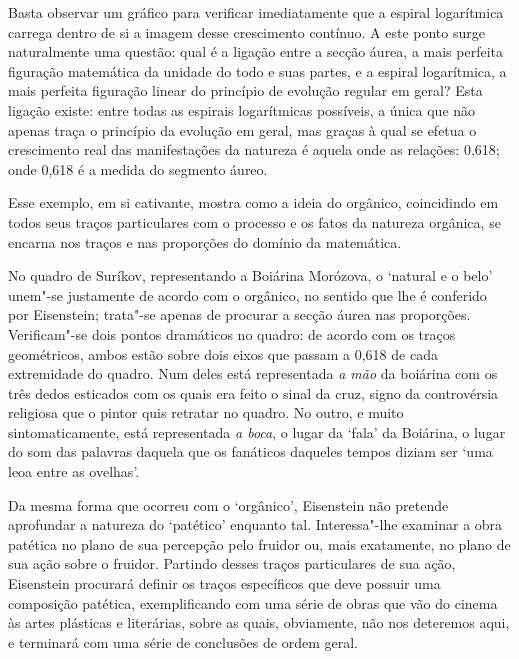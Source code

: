 Basta observar um gráfico para verificar imediatamente que a espiral
logarítmica carrega dentro de si a imagem desse crescimento contínuo. A
este ponto surge naturalmente uma questão: qual é a ligação entre a
secção áurea, a mais perfeita figuração matemática da unidade do todo e
suas partes, e a espiral logarítmica, a mais perfeita figuração linear
do princípio de evolução regular em geral? Esta ligação existe: entre
todas as espirais logarítmicas possíveis, a única que não apenas traça o
princípio da evolução em geral, mas graças à qual se efetua o
crescimento real das manifestações da natureza é aquela onde as
relações:
0,618; onde 0,618 é a medida do segmento áureo.

Esse exemplo, em si cativante, mostra como a ideia do orgânico,
coincidindo em todos seus traços particulares com o processo e os fatos
da natureza orgânica, se encarna nos traços e nas proporções do domínio
da matemática.

No quadro de Suríkov, representando a Boiárina Morózova, o `natural e o
belo' unem"-se justamente de acordo com o orgânico, no sentido que lhe é
conferido por Eisenstein; trata"-se apenas de procurar a secção áurea nas
proporções. Verificam"-se dois pontos dramáticos no quadro: de acordo com
os traços geométricos, ambos estão sobre dois eixos que passam a 0,618
de cada extremidade do quadro. Num deles está representada \emph{a
mão} da boiárina com os três dedos esticados com os quais era feito o
sinal da cruz, signo da controvérsia religiosa que o pintor quis
retratar no quadro. No outro, e muito sintomaticamente, está
representada \emph{a boca}, o lugar da `fala' da Boiárina, o lugar do
som das palavras daquela que os fanáticos daqueles tempos diziam ser
`uma leoa entre as ovelhas'.


Da mesma forma que ocorreu com o `orgânico', Eisenstein não pretende
aprofundar a natureza do `patético' enquanto tal. Interessa"-lhe examinar
a obra patética no plano de sua percepção pelo fruidor ou, mais
exatamente, no plano de sua ação sobre o fruidor. Partindo desses traços
particulares de sua ação, Eisenstein procurará definir os traços
específicos que deve possuir uma composição patética, exemplificando com
uma série de obras que vão do cinema às artes plásticas e literárias,
sobre as quais, obviamente, não nos deteremos aqui, e terminará com uma
série de conclusões de ordem geral.


